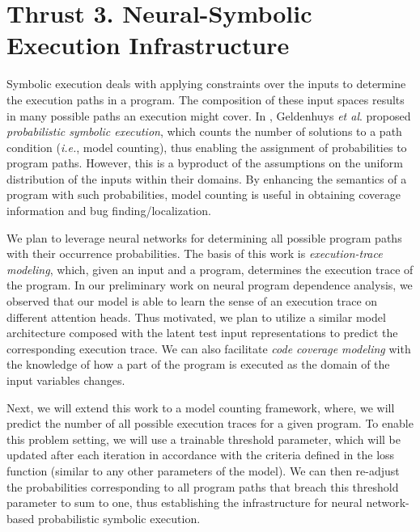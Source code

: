 \section{Thrust 3. Neural-Symbolic Execution Infrastructure}


Symbolic execution deals with applying constraints over the inputs to determine the execution paths in a program. The composition of these input spaces results in many possible paths an execution might cover. In \cite{10.1145/2338965.2336773}, Geldenhuys {\em et al}. proposed {\em probabilistic symbolic execution}, which counts the number of solutions to a path condition ({\em i.e.}, model counting), thus enabling the assignment of probabilities to program paths. However, this is a byproduct of the assumptions on the uniform distribution of the inputs within their domains. By enhancing the semantics of a program with such probabilities, model counting is useful in obtaining coverage information and bug finding/localization.

We plan to leverage neural networks for determining all possible program paths with their occurrence probabilities. The basis of this work is {\em execution-trace modeling}, which, given an input and a program, determines the execution trace of the program. In our preliminary work on neural program dependence analysis, we observed that our model is able to learn the sense of an execution trace on different attention heads. Thus motivated, we plan to utilize a similar model architecture composed with the latent test input representations to predict the corresponding execution trace. We can also facilitate {\em code coverage modeling} with the knowledge of how a part of the program is executed as the domain of the input variables changes. 

Next, we will extend this work to a model counting framework, where, we will predict the number of all possible execution traces for a given program. To enable this problem setting, we will use a trainable threshold parameter, which will be updated after each iteration in accordance with the criteria defined in the loss function (similar to any other parameters of the model). We can then re-adjust the probabilities corresponding to all program paths that breach this threshold parameter to sum to one, thus establishing the infrastructure for neural network-based probabilistic symbolic execution.  


